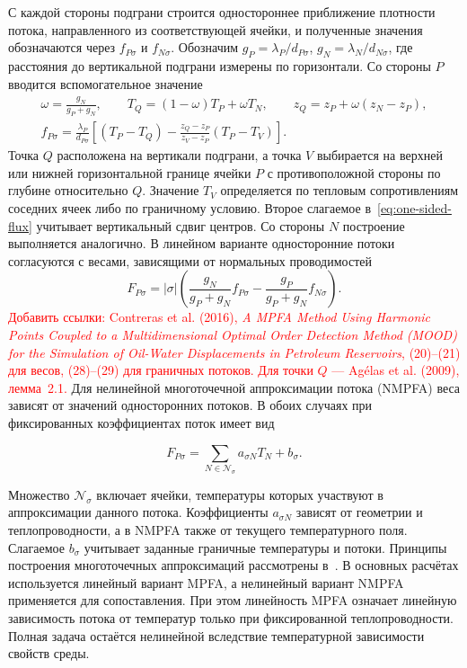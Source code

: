 С каждой стороны подграни строится одностороннее приближение плотности потока, направленного из соответствующей ячейки, и полученные значения обозначаются через $f_{P\sigma}$ и $f_{N\sigma}$. Обозначим $g_P=\lambda_P/d_{P\sigma}$, $g_N=\lambda_N/d_{N\sigma}$, где расстояния до вертикальной подграни измерены по горизонтали. Со стороны $P$ вводится вспомогательное значение
\begin{gather}
 \omega = \frac{g_N}{g_P + g_N},\qquad
 T_Q = (1 - \omega)T_P + \omega T_N,\qquad
 z_Q = z_P + \omega(z_N - z_P),\\
 f_{P\sigma} = \frac{\lambda_P}{d_{P\sigma}}
 \left[(T_P - T_Q) - \frac{z_Q - z_P}{z_V - z_P}(T_P - T_V)\right].
 \label{eq:one-sided-flux}
\end{gather}
Точка $Q$ расположена на вертикали подграни, а точка $V$ выбирается на верхней или нижней горизонтальной границе ячейки $P$ с противоположной стороны по глубине относительно $Q$. Значение $T_V$ определяется по тепловым сопротивлениям соседних ячеек либо по граничному условию. Второе слагаемое в~\eqref{eq:one-sided-flux} учитывает вертикальный сдвиг центров. Со стороны $N$ построение выполняется аналогично. В линейном варианте односторонние потоки согласуются с весами, зависящими от нормальных проводимостей
\begin{equation}
 F_{P\sigma} = |\sigma|\left(
 \frac{g_N}{g_P + g_N}f_{P\sigma}
 - \frac{g_P}{g_P + g_N}f_{N\sigma}\right).
 \label{eq:mpfa-combination}
\end{equation}
\textcolor{red}{Добавить ссылки: Contreras et al. (2016), \textit{A MPFA Method Using Harmonic Points Coupled to a Multidimensional Optimal Order Detection Method (MOOD) for the Simulation of Oil-Water Displacements in Petroleum Reservoirs}, (20)--(21) для весов, (28)--(29) для граничных потоков. Для точки $Q$ --- Agélas et al. (2009), лемма~2.1.}
Для нелинейной многоточечной аппроксимации потока (NMPFA) веса зависят от значений односторонних потоков. В обоих случаях при фиксированных коэффициентах поток имеет вид

\begin{equation}
 F_{P\sigma} = \sum_{N \in \mathcal N_\sigma} a_{\sigma N}T_N + b_\sigma.
\end{equation}

Множество $\mathcal N_\sigma$ включает ячейки, температуры которых участвуют в аппроксимации данного потока. Коэффициенты $a_{\sigma N}$ зависят от геометрии и теплопроводности, а в NMPFA также от текущего температурного поля. Слагаемое $b_\sigma$ учитывает заданные граничные температуры и потоки. Принципы построения многоточечных аппроксимаций рассмотрены в~\cite[гл.~2]{inmost2020}. В основных расчётах используется линейный вариант MPFA, а нелинейный вариант NMPFA применяется для сопоставления. При этом линейность MPFA означает линейную зависимость потока от температур только при фиксированной теплопроводности. Полная задача остаётся нелинейной вследствие температурной зависимости свойств среды.

